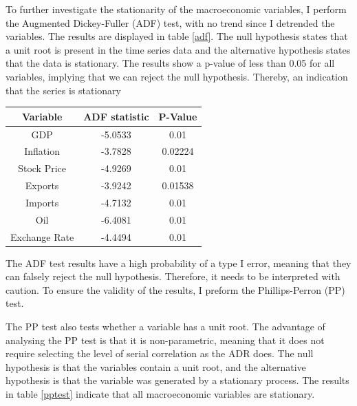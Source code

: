 \documentclass[11pt,preprint, authoryear]{elsarticle}
\let\origtable\table
\let\endorigtable\endtable
\renewenvironment{table}[1][2] {
    \expandafter\origtable\expandafter[H]
} {
    \endorigtable
}
\numberwithin{equation}{section}
\numberwithin{figure}{section}
\numberwithin{table}{section}
\begin{document}
To further investigate the stationarity of the macroeconomic variables,
I perform the Augmented Dickey-Fuller (ADF) test, with no trend since I
detrended the variables. The results are displayed in table \ref{adf}.
The null hypothesis states that a unit root is present in the time
series data and the alternative hypothesis states that the data is
stationary. The results show a p-value of less than 0.05 for all
variables, implying that we can reject the null hypothesis. Thereby, an
indication that the series is stationary

\begin{table}
\begin{center}
\begin{tabular}{ |c|c|c| } 
 \hline
 Variable & ADF statistic & P-Value \\ 
 \hline
 GDP & -5.0533 & 0.01 \\ 
 Inflation & -3.7828 & 0.02224 \\
 Stock Price & -4.9269 & 0.01 \\
 Exports & -3.9242 & 0.01538 \\
 Imports & -4.7132 & 0.01 \\
 Oil & -6.4081 & 0.01 \\
 Exchange Rate & -4.4494 & 0.01 \\
 \hline
\end{tabular}
\caption{Augmented Dickey-Fuller Test Analysis}
 \label{adf}
\end{center}
\end{table}

The ADF test results have a high probability of a type I error, meaning
that they can falsely reject the null hypothesis. Therefore, it needs to
be interpreted with caution. To ensure the validity of the results, I
preform the Phillips-Perron (PP) test.

The PP test also tests whether a variable has a unit root. The advantage
of analysing the PP test is that it is non-parametric, meaning that it
does not require selecting the level of serial correlation as the ADR
does. The null hypothesis is that the variables contain a unit root, and
the alternative hypothesis is that the variable was generated by a
stationary process. The results in table \ref{pptest} indicate that all
macroeconomic variables are stationary.
\end{document}
